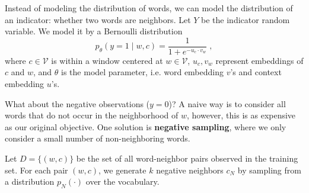 \documentclass{article}
\theoremstyle{case}
\theoremstyle{definition}
\begin{document}
Instead of modeling the distribution of words,
we can model the distribution of an indicator: whether two words are neighbors.
Let $Y$ be the indicator random variable.
We model it by a Bernoulli distribution
$$
p_\theta(y=1\mid w, c) = \frac{1}{1 + e^{-u_c\cdot v_w}} \;,
$$
where $c \in \mathcal{V}$ is within a window centered at $w\in \mathcal{V}$,
$u_c, v_w$ represent embeddings of $c$ and $w$,
and $\theta$ is the model parameter, i.e. word embedding $v$'s and context embedding $u$'s.

What about the negative observations ($y=0$)?
A naive way is to consider all words that do not occur in the neighborhood of $w$, however, this is as expensive as our original objective.
One solution is \textbf{negative sampling}, where we only consider a small number of non-neighboring words.

Let $D=\{(w, c)\}$ be the set of all word-neighbor pairs observed in the training set.
For each pair $(w,c)$, we generate $k$ negative neighbors $c_N$ by sampling from a distribution $p_N(\cdot)$ over the vocabulary.
\end{document}
